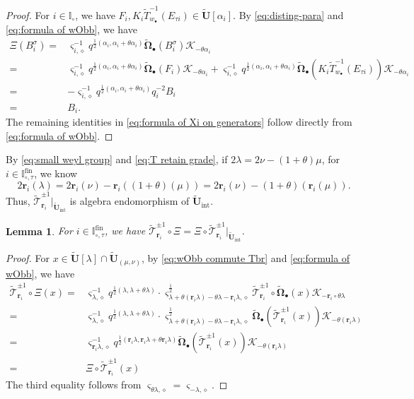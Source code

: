 \documentclass[a4paper,reqno,12pt]{amsart}
\numberwithin{equation}{section}
\newtheorem{lemma}[proposition]{Lemma}
\theoremstyle{definition}
\theoremstyle{plain}
\theoremstyle{definition}
\def\I{\mathbb I}
\def\wI{\I_\circ}
\def\bw{w_\bullet}
\def\br{\mathbf r}
\def\tU{\widetilde{\mathbf U}}
\def\tTD{\widetilde T}
\def\tT{\widetilde{\mathscr T}}
\def\cK{\mathcal K}
\def\vs{\varsigma}
\def\dm{\diamond}
\def \wItau{\I_{\circ,\tau}}
\def \fwItau{\wItau^{\mathrm{fin}}}
\def \wObb{\widetilde{\mathbf{\Omega}}_\bullet}
\begin{document}
\begin{proof}
For $i\in\wI$, we have $F_i,K_i\tTD_{\bw}^{-1}(E_{\tau i})\in\tU[\alpha_i]$. By \eqref{eq:disting-para} and \eqref{eq:formula of wObb}, we have
\begin{align*}
\Xi(B_i^\sigma)=& \vs_{i,\dm}^{-1}q^{\frac{1}{2}(\alpha_i,\alpha_i+\theta\alpha_i)}\wObb(B_i^\sigma)\cK_{-\theta\alpha_i}\\
=&\vs_{i,\dm}^{-1}q^{\frac{1}{2}(\alpha_i,\alpha_i+\theta\alpha_i)}\wObb(F_i)\cK_{-\theta\alpha_i}+\vs_{i,\dm}^{-1}q^{\frac{1}{2}(\alpha_i,\alpha_i+\theta\alpha_i)}\wObb(K_i\tTD_{\bw}^{-1}(E_{\tau i}))\cK_{-\theta\alpha_i}\\
=&-\vs_{i,\dm}^{-1}q^{\frac{1}{2}(\alpha_i,\alpha_i+\theta\alpha_i)}q_i^{-2}B_i\\
=&B_i.
\end{align*}
The remaining identities in \eqref{eq:formula of Xi on generators}  follow directly from \eqref{eq:formula of wObb}.
\end{proof}

 By \eqref{eq:small weyl group} and \eqref{eq:T retain grade}, if $2\lambda=2\nu-(1+\theta)\mu$, for $i\in\fwItau$, we know
\[2\br_i(\lambda)=2\br_i(\nu)-\br_i((1+\theta)(\mu))=2\br_i(\nu)-(1+\theta)(\br_i(\mu)).\]
Thus, $\tT_{\br_i}^{\pm1}|_{\tU_{\text{int}}}$ is algebra endomorphism of $\tU_{\text{int}}$.
\begin{lemma}\label{lem:Xi commute brT}
  For $i\in\fwItau$, we have $\tT_{\br_i}^{\pm1}\circ\Xi=\Xi\circ\tT_{\br_i}^{\pm1}|_{\tU_{\text{int}}}$.
\end{lemma}
\begin{proof}
    For $x\in\tU[\lambda]\cap\tU_{(\mu,\nu)}$, by \eqref{eq:wObb commute Tbr} and \eqref{eq:formula of wObb}, we have
    \begin{align*}
        \tT_{\br_i}^{\pm1}\circ\Xi(x)=&\vs_{\lambda,\dm}^{-1}q^{\frac{1}{2}(\lambda,\lambda+\theta\lambda)}\cdot\vs^{\frac{1}{2}}_{\lambda+\theta(\br_i\lambda)-\theta\lambda-\br_i\lambda,\dm}\tT_{\br_i}^{\pm1}\circ\wObb(x)\cK_{-\br_i\circ\theta\lambda}\\
        =&\vs_{\lambda,\dm}^{-1}q^{\frac{1}{2}(\lambda,\lambda+\theta\lambda)}\cdot\vs^{\frac{1}{2}}_{\lambda+\theta(\br_i\lambda)-\theta\lambda-\br_i\lambda,\dm}\wObb(\tT_{\br_i}^{\pm1}(x))\cK_{-\theta(\br_i\lambda)}\\
        =&\vs_{\br_i\lambda,\dm}^{-1}q^{\frac{1}{2}(\br_i\lambda,\br_i\lambda+\theta\br_i\lambda)}\wObb(\tT_{\br_i}^{\pm1}(x))\cK_{-\theta(\br_i\lambda)}\\
        =&\Xi\circ\tT_{\br_i}^{\pm1}(x)
    \end{align*}
    The third equality follows from $\vs_{\theta\lambda,\dm}=\vs_{-\lambda,\dm}.$
\end{proof}
\end{document}
